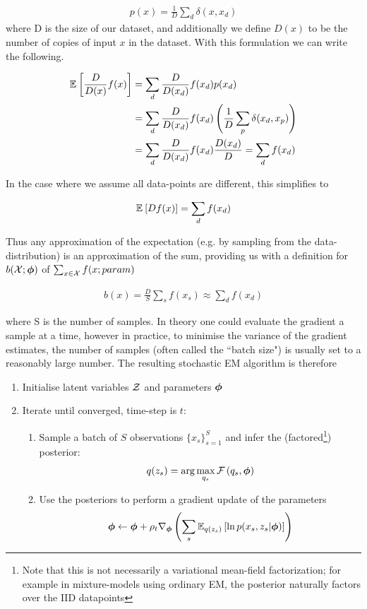 \begin{align*}
p(x) = \frac{1}{D} \sum_d \delta(x, x_d)
\end{align*}
where D is the size of our dataset, and additionally we define $D(x)$ to be the number of copies of input $x$ in the dataset. With this formulation we can write the following.

\begin{align*}
\ex{\frac{D}{D(x)} f(x)}{}
& = \sum_d \frac{D}{D(x_d)} f(x_d) p(x_d) \\
& = \sum_d \frac{D}{D(x_d)} f(x_d) \left(\frac{1}{D} \sum_p \delta(x_d, x_p)\right) \\ 
& = \sum_d \frac{D}{D(x_d)} f(x_d) \frac{D(x_d)}{D} = \sum_d f(x_d)
\end{align*}

In the case where we assume all data-points are different, this simplifies to

\begin{align*}
\ex{D f(x)}{} = \sum_d f(x_d)
\end{align*}

Thus any approximation of the expectation (e.g. by sampling from the data-distribution) is an approximation of the sum, providing us with a definition for $b(\xdat; \param)$ of $\sum_{x \in \xdat} f(x;param)$

\begin{align*}
b(x) = \frac{D}{S} \sum_s f(x_s) \approx \sum_d f(x_d)
\end{align*}

where S is the number of samples. In theory one could evaluate the gradient a sample at a time, however in practice, to minimise the variance of the gradient estimates, the number of samples (often called the ``batch size") is usually set to a reasonably large number. The resulting stochastic EM algorithm is therefore

\begin{enumerate}
    \item Initialise latent variables $\zdat$ and parameters $\param$
    \item Iterate until converged, time-step is $t$:
    \begin{enumerate}
        \item Sample a batch of $S$ observations $\{ x_s \}_{s=1}^S$ and infer the (factored\footnote{Note that this is not necessarily a variational mean-field factorization; for example in mixture-models using ordinary EM, the posterior naturally factors over the IID datapoints}) posterior:
        \begin{align*}
            q(z_s) = \arg \max_{q_s} \fqt{q_s, \param}
        \end{align*}
        \item Use the posteriors to perform a gradient update of the parameters
        \begin{align*}
        \param \leftarrow \param + \rho_t \nabla_\param \left(\sum_s \ex{\ln p(x_s, z_s|\param)}{q(z_s)}\right)
        \end{align*}
        \end{enumerate}
\end{enumerate}

